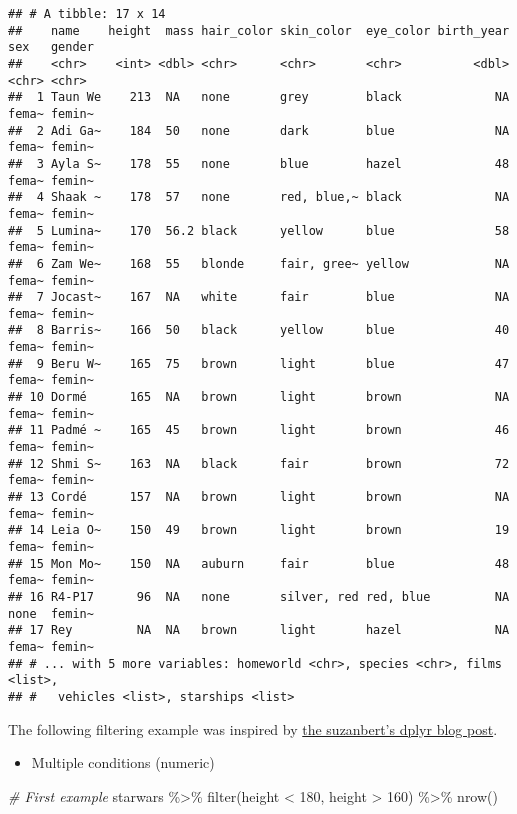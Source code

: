 \documentclass[
]{book}
\newenvironment{Shaded}{\begin{snugshade}}{\end{snugshade}}
\newcommand{\CommentTok}[1]{\textcolor[rgb]{0.56,0.35,0.01}{\textit{#1}}}
\newcommand{\DecValTok}[1]{\textcolor[rgb]{0.00,0.00,0.81}{#1}}
\newcommand{\FunctionTok}[1]{\textcolor[rgb]{0.00,0.00,0.00}{#1}}
\newcommand{\NormalTok}[1]{#1}
\newcommand{\SpecialCharTok}[1]{\textcolor[rgb]{0.00,0.00,0.00}{#1}}
\providecommand{\tightlist}{%
  \setlength{\itemsep}{0pt}\setlength{\parskip}{0pt}}
\begin{document}
\begin{verbatim}
## # A tibble: 17 x 14
##    name    height  mass hair_color skin_color  eye_color birth_year sex   gender
##    <chr>    <int> <dbl> <chr>      <chr>       <chr>          <dbl> <chr> <chr> 
##  1 Taun We    213  NA   none       grey        black             NA fema~ femin~
##  2 Adi Ga~    184  50   none       dark        blue              NA fema~ femin~
##  3 Ayla S~    178  55   none       blue        hazel             48 fema~ femin~
##  4 Shaak ~    178  57   none       red, blue,~ black             NA fema~ femin~
##  5 Lumina~    170  56.2 black      yellow      blue              58 fema~ femin~
##  6 Zam We~    168  55   blonde     fair, gree~ yellow            NA fema~ femin~
##  7 Jocast~    167  NA   white      fair        blue              NA fema~ femin~
##  8 Barris~    166  50   black      yellow      blue              40 fema~ femin~
##  9 Beru W~    165  75   brown      light       blue              47 fema~ femin~
## 10 Dormé      165  NA   brown      light       brown             NA fema~ femin~
## 11 Padmé ~    165  45   brown      light       brown             46 fema~ femin~
## 12 Shmi S~    163  NA   black      fair        brown             72 fema~ femin~
## 13 Cordé      157  NA   brown      light       brown             NA fema~ femin~
## 14 Leia O~    150  49   brown      light       brown             19 fema~ femin~
## 15 Mon Mo~    150  NA   auburn     fair        blue              48 fema~ femin~
## 16 R4-P17      96  NA   none       silver, red red, blue         NA none  femin~
## 17 Rey         NA  NA   brown      light       hazel             NA fema~ femin~
## # ... with 5 more variables: homeworld <chr>, species <chr>, films <list>,
## #   vehicles <list>, starships <list>
\end{verbatim}

The following filtering example was inspired by \href{https://suzan.rbind.io/2018/02/dplyr-tutorial-3/}{the suzanbert's dplyr blog post}.

\begin{itemize}
\tightlist
\item
  Multiple conditions (numeric)
\end{itemize}

\begin{Shaded}
\begin{Highlighting}[]
\CommentTok{\# First example}
\NormalTok{starwars }\SpecialCharTok{\%\textgreater{}\%}
  \FunctionTok{filter}\NormalTok{(height }\SpecialCharTok{\textless{}} \DecValTok{180}\NormalTok{, height }\SpecialCharTok{\textgreater{}} \DecValTok{160}\NormalTok{) }\SpecialCharTok{\%\textgreater{}\%}
  \FunctionTok{nrow}\NormalTok{()}
\end{Highlighting}
\end{Shaded}
\end{document}
